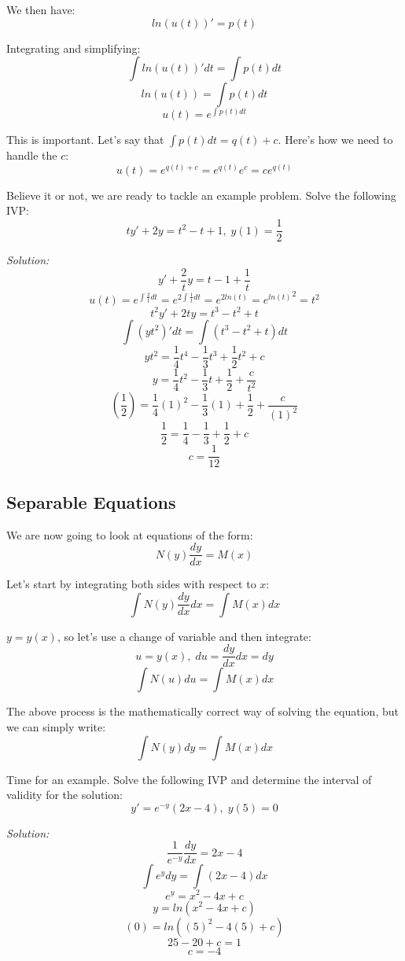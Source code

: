 	We then have: $$ln(u(t))' = p(t)$$
	
	Integrating and simplifying:
	$$\int ln(u(t))'dt = \int p(t)dt$$
	$$ln(u(t)) = \int p(t)dt$$
	$$u(t) = e^{\int p(t)dt}$$
	
	This is important. Let's say that $\int p(t)dt = q(t) + c$. Here's how we need to handle the $c$:
	$$u(t) = e^{q(t) + c} = e^{q(t)}e^{c} = ce^{q(t)}$$
	
	Believe it or not, we are ready to tackle an example problem. Solve the following IVP:
	$$ty' + 2y = t^2 - t + 1,\;y(1) = \frac{1}{2}$$
	
	\textit{Solution:}
	$$y' + \frac{2}{t}y = t - 1 + \frac{1}{t}$$
	$$u(t) = e^{\int \frac{2}{t}dt} = e^{2\int \frac{1}{t}dt} = e^{2ln(t)} = {e^{ln(t)}}^2 = t^{2}$$
	$$t^{2}y' + 2ty = t^{3} - t^{2} + t$$
	$$\int (yt^{2})'dt = \int (t^{3} - t^{2} + t)dt$$
	$$yt^{2} = \frac{1}{4}t^{4} - \frac{1}{3}t^{3} + \frac{1}{2}t^{2} + c$$
	$$y = \frac{1}{4}t^{2} - \frac{1}{3}t + \frac{1}{2} + \frac{c}{t^{2}}$$
	$$\left(\frac{1}{2}\right) = \frac{1}{4}(1)^{2} - \frac{1}{3}(1) + \frac{1}{2} + \frac{c}{(1)^{2}}$$
	$$\frac{1}{2} = \frac{1}{4} - \frac{1}{3} + \frac{1}{2} + c$$
	$$c = \frac{1}{12}$$
	\begin{center}
	\end{center}
	
	\pagebreak
	
	\subsection{Separable Equations}
	We are now going to look at equations of the form:
	$$N(y)\frac{dy}{dx} = M(x)$$
	
	Let's start by integrating both sides with respect to $x$:
	$$\int N(y)\frac{dy}{dx}dx = \int M(x)dx$$
	
	$y = y(x)$, so let's use a change of variable and then integrate:
	$$u = y(x),\;du = \frac{dy}{dx}dx = dy$$
	$$\int N(u)du = \int M(x)dx$$
	
	The above process is the mathematically correct way of solving the equation, but we can simply write:
	$$\int N(y)dy = \int M(x)dx$$
	
	Time for an example. Solve the following IVP and determine the interval of validity for the solution:
	$$y' = e^{-y}(2x - 4),\;y(5) = 0$$
	
	\textit{Solution:}
	$$\frac{1}{e^{-y}}\frac{dy}{dx} = 2x - 4$$
	$$\int e^{y}dy = \int (2x - 4)dx$$
	$$e^{y} = x^{2} - 4x + c$$
	$$y = ln(x^{2} - 4x + c)$$
	$$(0) = ln((5)^{2} - 4(5) + c)$$
	$$25 - 20 + c = 1$$
	$$c = -4$$
	\begin{center}
	\end{center}
	
